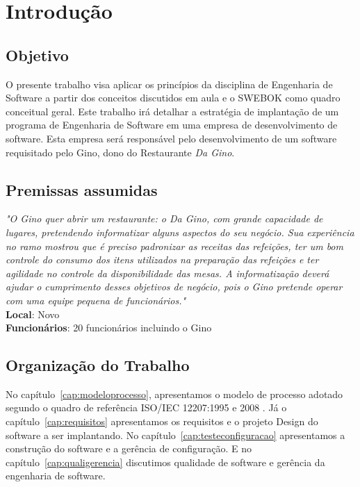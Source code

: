 \chapter{Introdução}
\label{cap:introducao}

\section{Objetivo}

O presente trabalho visa aplicar os princípios da disciplina de Engenharia de Software a partir dos conceitos discutidos em aula e o SWEBOK como quadro conceitual geral. Este trabalho irá detalhar a estratégia de implantação de um programa de Engenharia de Software em uma empresa de desenvolvimento de software. Esta empresa será responsável pelo desenvolvimento de um software requisitado pelo Gino, dono do Restaurante \textit{Da Gino}.

\section{Premissas assumidas}

\emph{"O Gino quer abrir um restaurante: o Da Gino, com grande capacidade de lugares, pretendendo informatizar alguns aspectos do seu negócio. Sua experiência no ramo mostrou que é preciso padronizar as receitas das refeições, ter um bom controle do consumo dos itens utilizados na preparação das refeições e ter agilidade no controle da disponibilidade das mesas. A informatização deverá ajudar o cumprimento desses objetivos de negócio, pois o Gino pretende operar com uma equipe pequena de funcionários."}\\
\textbf{Local}: Novo\\
\textbf{Funcionários}: 20 funcionários incluindo o Gino

\section{Organização do Trabalho}
\label{sec:organizacao_trabalho}

No capítulo~\ref{cap:modeloprocesso}, apresentamos o modelo de processo adotado segundo o quadro de referência ISO/IEC 12207:1995 e 2008 \cite{iso12207:95, iso12207:2008}. Já o capítulo~\ref{cap:requisitos} apresentamos os requisitos e o projeto Design do software a ser implantando. No capítulo~\ref{cap:testeconfiguracao} apresentamos a construção do software e a gerência de configuração. E no capítulo~\ref{cap:qualigerencia} discutimos qualidade de software e gerência da engenharia de software.


